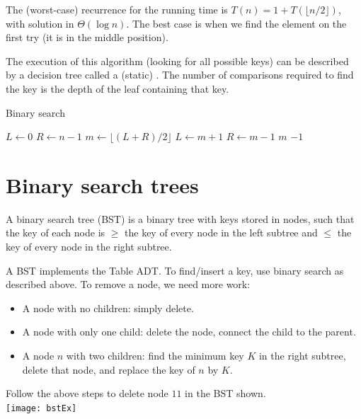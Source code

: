 The (worst-case) recurrence for the running time is $T(n) = 1 +  T(\lfloor n/2 \rfloor)$, with 
solution in $\Theta(\log n)$. The best case is when we find the element on the first try (it is in the middle position).

The execution of this algorithm (looking for all possible keys) can be 
described by a decision tree called a (static) . The 
number of comparisons required to find the key is the depth of the leaf 
containing that key.


\begin{algorithm}[H]
  \caption{Binary search
    \label{alg:binsearch}}
\begin{algorithmic}[1]
	\State $L \gets 0$
	\State $R \gets n-1$
		\State $m \gets \lfloor (L+R)/2\rfloor$ 
			\State $L\gets m+1$
			\State $R\gets m-1$
		\Else 
			\State \Return $m$ 
		\EndIf
	\EndWhile
	\Return $-1$ 
\EndFunction
\end{algorithmic}
\end{algorithm}

\section*{Binary search trees}
\begin{Definition}
A {binary search tree} (BST) is a binary tree with keys stored in nodes, 
such that the key of each node is $\geq$ the key of every node in the left subtree and $\leq$ 
the key of  every node in the right subtree.
\end{Definition}


A BST implements the Table ADT. To find/insert a key, use binary search as 
described above. To remove a node, we need more work:
\begin{itemize}
\item A node with no children: simply delete.
\item A node with only one child: delete the node, connect the child 
to the parent.
\item A node $n$ with two children: find the minimum key $K$ in the 
right subtree, delete that node, and replace the key of $n$ by $K$.
\end{itemize}

\begin{Boxample}[1] \label{eg:bstDeleteRight}
Follow the above steps to delete node $11$ in the BST shown.\\
\newline
\texttt{[image: bstEx]}
\end{Boxample}


